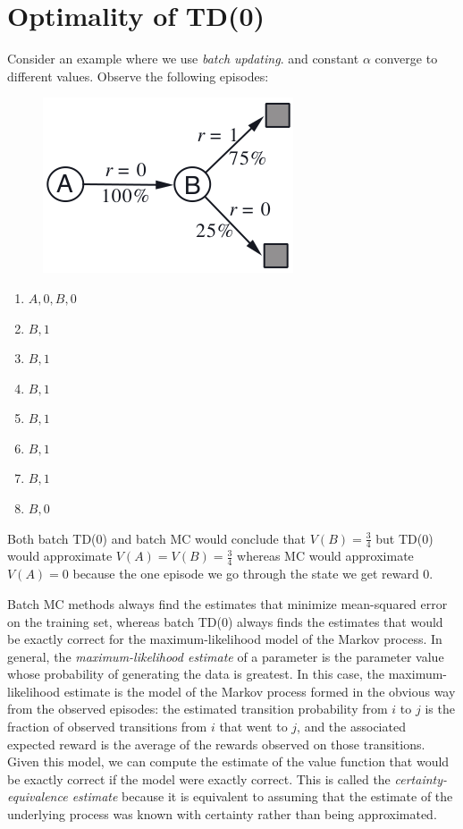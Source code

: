 \section{Optimality of TD(0)}
\label{sec:optimality_of_td0}
Consider an example where we use \emph{batch updating}.
 and constant $\alpha$ 
converge to different values.
Observe the following episodes:
\begin{figure}
    \centering
    \includegraphics[scale=0.4]{img/ex6_4.png}
\end{figure}
\begin{multicols}{2}
    \begin{enumerate}
        \item $A,0,B,0$
        \item $B,1$
        \item $B,1$
        \item $B,1$
        \item $B,1$
        \item $B,1$
        \item $B,1$
        \item $B,0$
    \end{enumerate}
\end{multicols}

Both batch TD(0) and batch MC would conclude that $V(B)=\frac{3}{4}$ but TD(0) would
approximate $V(A)=V(B)=\frac{3}{4}$ whereas MC would approximate $V(A)=0$ because the one
episode we go through the state we get reward $0$.

Batch MC methods always find the estimates that minimize mean-squared error on the
training set, whereas batch TD(0) always finds the estimates that would be exactly correct
for the maximum-likelihood model of the Markov process.
In general, the \emph{maximum-likelihood estimate} of a parameter is the parameter value
whose probability of generating the data is greatest.
In this case, the maximum-likelihood estimate is the model of the Markov process formed in the
obvious way from the observed episodes: the estimated transition probability from $i$ to $j$
is the fraction of observed transitions from $i$ that went to $j$, and the associated expected
reward is the average of the rewards observed on those transitions.
Given this model, we can compute the estimate of the value function that would be exactly
correct if the model were exactly correct.
This is called the \emph{certainty-equivalence estimate} because it is equivalent to assuming
that the estimate of the underlying process was known with certainty rather than being
approximated.

